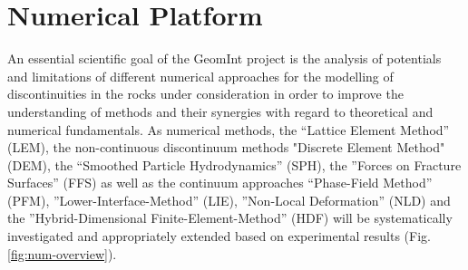 \chapter{Numerical Platform}
\label{cha:num}


An essential scientific goal of the GeomInt project is the analysis of potentials and limitations of different numerical approaches for the modelling of discontinuities in the rocks under consideration in order to improve the understanding of methods and their synergies with regard to theoretical and numerical fundamentals. As numerical methods, 
the ``Lattice Element Method'' (LEM),
the non-continuous discontinuum methods "Discrete Element Method" (DEM),
the ``Smoothed Particle Hydrodynamics'' (SPH),
the ''Forces on Fracture Surfaces'' (FFS) 
as well as the continuum approaches ``Phase-Field Method'' (PFM), ''Lower-Interface-Method'' (LIE), ''Non-Local Deformation'' (NLD) and the ''Hybrid-Dimensional Finite-Element-Method'' (HDF) will be systematically investigated and appropriately extended based on experimental results (Fig. \ref{fig:num-overview}).

